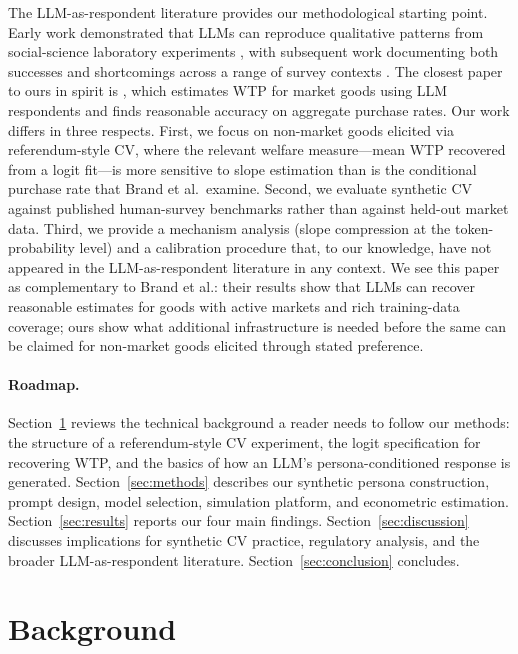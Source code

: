 \documentclass[12pt]{article}
\begin{document}
The LLM-as-respondent literature provides our methodological starting point. Early work demonstrated that LLMs can reproduce qualitative patterns from social-science laboratory experiments \parencite{Argyle2023, Horton2023, Aher2023}, with subsequent work documenting both successes and shortcomings across a range of survey contexts \parencite{Bisbee2024, Ross2024, vonderHeyde2025}. The closest paper to ours in spirit is \textcite{Brand2024}, which estimates WTP for market goods using LLM respondents and finds reasonable accuracy on aggregate purchase rates. Our work differs in three respects. First, we focus on non-market goods elicited via referendum-style CV, where the relevant welfare measure---mean WTP recovered from a logit fit---is more sensitive to slope estimation than is the conditional purchase rate that Brand et al.\ examine. Second, we evaluate synthetic CV against published human-survey benchmarks rather than against held-out market data. Third, we provide a mechanism analysis (slope compression at the token-probability level) and a calibration procedure that, to our knowledge, have not appeared in the LLM-as-respondent literature in any context. We see this paper as complementary to Brand et al.: their results show that LLMs can recover reasonable estimates for goods with active markets and rich training-data coverage; ours show what additional infrastructure is needed before the same can be claimed for non-market goods elicited through stated preference.

\paragraph{Roadmap.} Section~\ref{sec:background} reviews the technical background a reader needs to follow our methods: the structure of a referendum-style CV experiment, the logit specification for recovering WTP, and the basics of how an LLM's persona-conditioned response is generated. Section~\ref{sec:methods} describes our synthetic persona construction, prompt design, model selection, simulation platform, and econometric estimation. Section~\ref{sec:results} reports our four main findings. Section~\ref{sec:discussion} discusses implications for synthetic CV practice, regulatory analysis, and the broader LLM-as-respondent literature. Section~\ref{sec:conclusion} concludes.

\section{Background}\label{sec:background}
\end{document}
